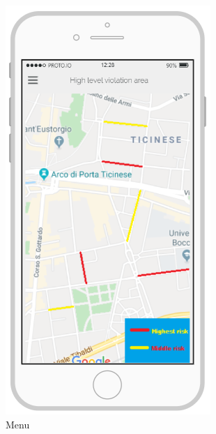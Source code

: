 \documentclass{article}
\begin{document}
\begin{figure}[H]
\begin{subfigure}[H]{0.25\linewidth}
					\includegraphics[width=\linewidth]{Images/Maps.png}
					\caption{Menu}
				\end{subfigure}
				\begin{subfigure}[H]{0.25\linewidth}

\end{subfigure}
\end{figure}
\end{document}
